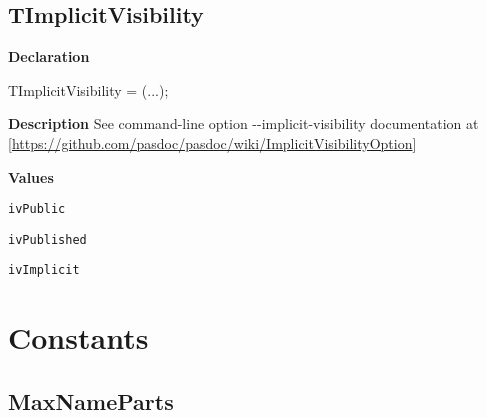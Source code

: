 \documentclass{report}
\newif\ifpdf
\begin{document}
\subsection*{TImplicitVisibility}
\fi
\label{PasDoc_Types-TImplicitVisibility}
\begin{list}{}{
\setlength{\itemindent}{0cm}
\setlength{\listparindent}{0cm}
\setlength{\leftmargin}{\evensidemargin}
\addtolength{\leftmargin}{\tmplength}
\settowidth{\labelsep}{X}
\addtolength{\leftmargin}{\labelsep}
\setlength{\labelwidth}{\tmplength}
}
\item[\textbf{Declaration}\hfill]
\ifpdf
\begin{flushleft}
\fi
\begin{ttfamily}
TImplicitVisibility = (...);\end{ttfamily}

\ifpdf
\end{flushleft}
\fi

\par
\item[\textbf{Description}]
See command{-}line option {-}{-}implicit{-}visibility documentation at [\href{https://github.com/pasdoc/pasdoc/wiki/ImplicitVisibilityOption}{https://github.com/pasdoc/pasdoc/wiki/ImplicitVisibilityOption}]\item[\textbf{Values}]
\begin{description}
\item[\texttt{ivPublic}] \label{PasDoc_Types-ivPublic}
\index{}
 
\item[\texttt{ivPublished}] \label{PasDoc_Types-ivPublished}
\index{}
 
\item[\texttt{ivImplicit}] \label{PasDoc_Types-ivImplicit}
\index{}
 
\end{description}


\end{list}
\section{Constants}
\ifpdf
\subsection*{\large{\textbf{MaxNameParts}}\normalsize\hspace{1ex}\hrulefill}
\else
\end{document}
